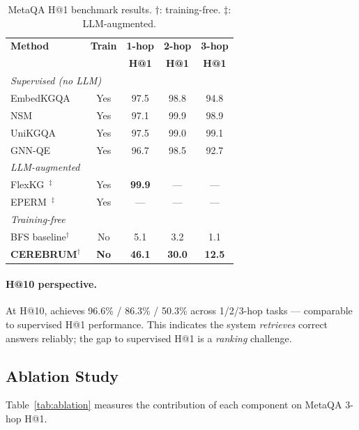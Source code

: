 \documentclass[10pt,twocolumn]{article}
\begin{document}
\begin{table}[h]
\small
\centering
\caption{MetaQA H@1 benchmark results. $\dagger$: training-free. $\ddagger$: LLM-augmented.}
\label{tab:main}
\begin{tabular}{lcccc}
\toprule
\textbf{Method} & \textbf{Train} & \textbf{1-hop} & \textbf{2-hop} & \textbf{3-hop} \\
                &                & \textbf{H@1}   & \textbf{H@1}   & \textbf{H@1} \\
\midrule
\multicolumn{5}{l}{\textit{Supervised (no LLM)}} \\
EmbedKGQA~\cite{saxena2020improve} & Yes & 97.5 & 98.8 & 94.8 \\
NSM~\cite{he2021}                  & Yes & 97.1 & 99.9 & 98.9 \\
UniKGQA~\cite{jiang2023}           & Yes & 97.5 & 99.0 & 99.1 \\
GNN-QE~\cite{zhu2022gnnqe}         & Yes & 96.7 & 98.5 & 92.7 \\
\midrule
\multicolumn{5}{l}{\textit{LLM-augmented}} \\
FlexKG~\cite{flexkg2025}$^\ddagger$  & Yes & \textbf{99.9} & — & — \\
EPERM~\cite{eperm2025}$^\ddagger$    & Yes & — & — & — \\
\midrule
\multicolumn{5}{l}{\textit{Training-free}} \\
BFS baseline$^\dagger$             & No  &  5.1 &  3.2 &  1.1 \\
\textbf{CEREBRUM}$^\dagger$        & \textbf{No} & \textbf{46.1} & \textbf{30.0} & \textbf{12.5} \\
\bottomrule
\end{tabular}
\end{table}

\paragraph{H@10 perspective.}
At H@10, \CEREBRUM{} achieves 96.6\% / 86.3\% / 50.3\% across 1/2/3-hop tasks —
comparable to supervised H@1 performance. This indicates the system \emph{retrieves}
correct answers reliably; the gap to supervised H@1 is a \emph{ranking} challenge.

\subsection{Ablation Study}
\label{sec:ablation}

Table~\ref{tab:ablation} measures the contribution of each component on MetaQA 3-hop H@1.
\end{document}
